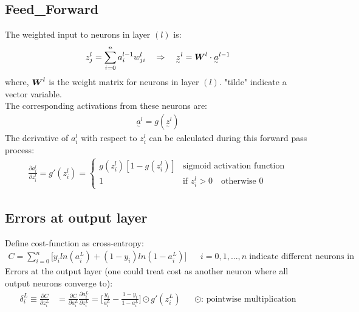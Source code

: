 \documentclass{extarticle}
\theoremstyle{definition}
\theoremstyle{definition}
\newcommand{\mdvec}[1]{\underset{^\sim}#1} %
\newcommand{\mdmat}[1]{\boldsymbol{\MakeUppercase{#1}}} %
\begin{document}
\subsection{Feed\_Forward}
The weighted input to neurons in layer $(l)$ is:
\begin{align*}
	z_j^l = \sum_{i=0}^{n} a_i^{l-1} w_{ji}^l \quad \Rightarrow \quad \mdvec{z^l} = \mdmat{w}^l \cdot \mdvec{a^{l-1}}
\end{align*}
where, $\mdmat{w}^l$ is the weight matrix for neurons in layer $(l)$. "tilde" indicate a vector variable.\\
The corresponding activations from these neurons are:
\begin{align*}
	\mdvec{a^l} = g(\mdvec{z^l})
\end{align*}
The derivative of $a_i^l$ with respect to $z_i^l$ can be calculated during this forward pass process:
\begin{align*}
	\frac{\partial a_i^l}{\partial z_i^l} = g'(z_i^l) = \begin{cases}
		g(z_i^l) [1 - g(z_i^l)] & \text{sigmoid activation function}\\
		1 & \text{if } z_i^l > 0 \quad \text{otherwise 0}
	\end{cases}
\end{align*}

\subsection{Errors at output layer}
Define cost-function as cross-entropy:
\begin{align*}
	C = \sum_{i=0}^{n} \bigg[y_i ln(a_i^L) + (1 - y_i) ln(1 - a_i^L)\bigg] && i = 0, 1, ..., n \; \text{indicate different neurons in the output layer}
\end{align*}
Errors at the output layer (one could treat cost as another neuron where all output neurons converge to):
\begin{align*}
	\delta_i^L \equiv \frac{\partial C}{\partial z_i^L} &= \frac{\partial C}{\partial a_i^L} \frac{\partial a_i^L}{\partial z_i^L}
	= \bigg[\frac{y_i}{a_i^L} - \frac{1 - y_i}{1 - a_i^L}\bigg] \odot g'(z_i^L) && \text{$\odot$: pointwise multiplication}
\end{align*}
\end{document}
